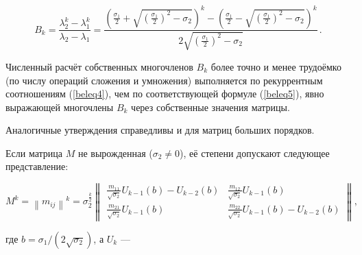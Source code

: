 \begin{equation}

B_k=\frac{\lambda_2^k-\lambda_1^k}{\lambda_2-\lambda_1}=\frac{\left(\displaystyle\frac{\sigma_1}{2}+\sqrt{\left(\frac{\sigma_1}{2}\right)^2-\sigma_2}\right)^k-\left(\displaystyle\frac{\sigma_1}{2}-\sqrt{\left(\frac{\sigma_1}{2}\right)^2-\sigma_2}\right)^k}{2\displaystyle\sqrt{\left(\frac{\sigma_1}{2}\right)^2-\sigma_2}}\,.\label{beleq5}

\end{equation}



\begin{remark} 

Численный расчёт собственных многочленов $B_k$ более точно и менее трудоёмко (по числу операций сложения и умножения) выполняется по рекуррентным соотношениям (\ref{beleq4}), чем по соответствующей формуле (\ref{beleq5}), явно выражающей многочлены $B_k$ через собственные значения матрицы.        

Аналогичные утверждения справедливы и для матриц больших порядков.

\end{remark}



\smallskip



Если матрица $M$ не вырожденная ($\sigma_2\neq0$), её степени допускают следующее представление:

\begin{equation}

M^k=\left\|m_{ij}\right\|^k=\sigma_2^{\frac{k}{2}}

\begin{Vmatrix}

\displaystyle\frac{\displaystyle m_{\scriptscriptstyle11}}{\sqrt{\displaystyle\sigma_2}}U_{k - 1}(b)-U_{k - 2}(b)&\displaystyle\frac{\displaystyle m_{\scriptscriptstyle12}}{\sqrt{\displaystyle\sigma_2}}U_{k - 1}(b)\\

\displaystyle\frac{\displaystyle m_{\scriptscriptstyle21}}{\sqrt{\displaystyle\sigma_2}}U_{k - 1}(b)&\displaystyle\frac{\displaystyle m_{\scriptscriptstyle22}}{\sqrt{\displaystyle\sigma_2}}U_{k - 1}(b)-U_{k - 2}(b)\label{beleq7}

\end{Vmatrix},

\end{equation}

где $b={\sigma_1}/({2\sqrt{\sigma_2}})$, а $U_k$ ---

